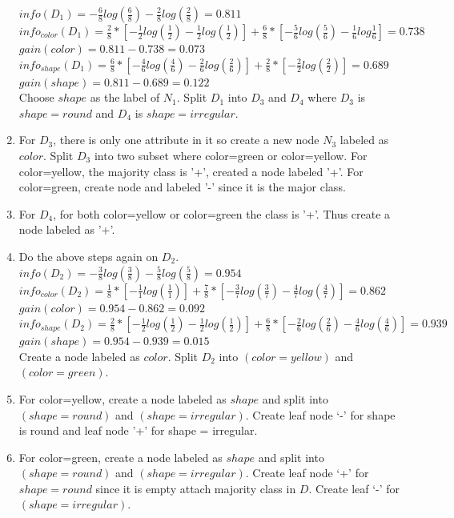 \documentclass[11pt]{article} %
\begin{document}
\begin{enumerate}
$info(D_1)=-\frac{6}{8}log(\frac{6}{8})-\frac{2}{8}log(\frac{2}{8})=0.811$\\
$info_{color}(D_1)=\frac{2}{8}*[-\frac{1}{2}log(\frac{1}{2})-\frac{1}{2}log(\frac{1}{2})]+
				\frac{6}{8}*[-\frac{5}{6}log(\frac{5}{6})-\frac{1}{6}log{\frac{1}{6}}]=0.738$\\
$gain(color) = 0.811-0.738=0.073$\\
$info_{shape}(D_1)=\frac{6}{8}*[-\frac{4}{6}log(\frac{4}{6})-\frac{2}{6}log(\frac{2}{6})]+
				\frac{2}{8}*[-\frac{2}{2}log(\frac{2}{2})]=0.689$\\
$gain(shape) = 0.811 - 0.689 = 0.122$\\
Choose $shape$ as the label of $N_1$. Split $D_1$ into $D_3$ and $D_4$ where $D_3$ is $shape = round$ and $D_4$ is $shape=irregular$.
\item For $D_3$, there is only one attribute in it so create a new node $N_3$ labeled as $color$. Split $D_3$ into two subset where color=green or color=yellow. For color=yellow, the majority class is '+', created a node labeled '+'. For color=green, create node and labeled '-' since it is the major class.
\item For $D_4$, for both color=yellow or color=green the class is '+'. Thus create a node labeled as '+'.
\item Do the above steps again on $D_2$.\\
$info(D_2)=-\frac{3}{8}log(\frac{3}{8})-\frac{5}{8}log(\frac{5}{8})=0.954$\\
$info_{color}(D_2) = \frac{1}{8}*[-\frac{1}{1}log(\frac{1}{1})]+
				\frac{7}{8}*[-\frac{3}{7}log(\frac{3}{7})-\frac{4}{7}log(\frac{4}{7})]=0.862$\\
$gain(color) = 0.954-0.862=0.092$\\
$info_{shape}(D_2) = \frac{2}{8}*[-\frac{1}{2}log(\frac{1}{2})-\frac{1}{2}log(\frac{1}{2})]+
				\frac{6}{8}*[-\frac{2}{6}log(\frac{2}{6})-\frac{4}{6}log(\frac{4}{6})]=0.939$\\
$gain(shape) = 0.954-0.939 = 0.015$\\
Create a node labeled as $color$. Split $D_2$ into $(color=yellow)$ and $(color=green)$.
\item For color=yellow, create a node labeled as $shape$ and split into $ (shape=round)$ and $(shape=irregular)$. Create leaf node `-' for shape is round and leaf node '+' for shape = irregular.
\item For color=green, create a node labeled as $shape$ and split into $(shape=round)$ and $(shape=irregular)$. Create leaf node `+' for $shape=round$ since it is empty attach majority class in $D$. Create leaf `-' for $(shape=irregular)$.
\end{enumerate}
\end{document}
